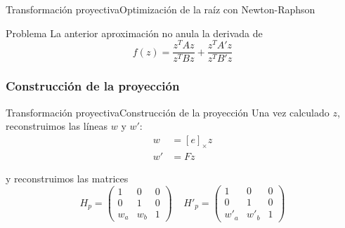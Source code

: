 \documentclass[aspectratio=169,14pt,spanish]{beamer}
\begin{document}
        \begin{frame}{Transformación proyectiva}{Optimización de la raíz con Newton-Raphson}

            \begin{alertblock}{Problema}
                La anterior aproximación no anula la derivada de \[f(z) = \frac{z^T Az}{z^T Bz} + \frac{z^T A'z}{z^T B'z}\]

            \end{alertblock}


        \end{frame}
        \subsubsection{Construcción de la proyección}

          \begin{frame}{Transformación proyectiva}{Construcción de la proyección}
              Una vez calculado $z$, reconstruimos las líneas  $w$ y $w'$:
              \begin{align*}
                w &= [e]_\times z\\
                w' &= Fz
              \end{align*}

              y reconstruimos las matrices \[H_p =
              \begin{pmatrix}
                  1 & 0 & 0 \\
                  0 & 1 & 0 \\
                  w_a & w_b & 1
              \end{pmatrix}\;\;\;\;
              H'_p =
              \begin{pmatrix}
                  1 & 0 & 0 \\
                  0 & 1 & 0 \\
                  w'_a & w'_b & 1
              \end{pmatrix}\]
          \end{frame}
\end{document}
